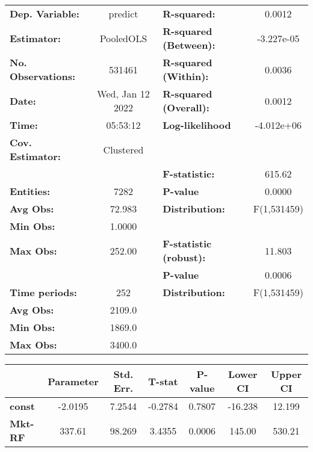\begin{center}
\begin{tabular}{lclc}
\toprule
\textbf{Dep. Variable:}    &      predict       & \textbf{  R-squared:         }   &      0.0012      \\
\textbf{Estimator:}        &     PooledOLS      & \textbf{  R-squared (Between):}  &    -3.227e-05    \\
\textbf{No. Observations:} &       531461       & \textbf{  R-squared (Within):}   &      0.0036      \\
\textbf{Date:}             &  Wed, Jan 12 2022  & \textbf{  R-squared (Overall):}  &      0.0012      \\
\textbf{Time:}             &      05:53:12      & \textbf{  Log-likelihood     }   &    -4.012e+06    \\
\textbf{Cov. Estimator:}   &     Clustered      & \textbf{                     }   &                  \\
\textbf{}                  &                    & \textbf{  F-statistic:       }   &      615.62      \\
\textbf{Entities:}         &        7282        & \textbf{  P-value            }   &      0.0000      \\
\textbf{Avg Obs:}          &       72.983       & \textbf{  Distribution:      }   &   F(1,531459)    \\
\textbf{Min Obs:}          &       1.0000       & \textbf{                     }   &                  \\
\textbf{Max Obs:}          &       252.00       & \textbf{  F-statistic (robust):} &      11.803      \\
\textbf{}                  &                    & \textbf{  P-value            }   &      0.0006      \\
\textbf{Time periods:}     &        252         & \textbf{  Distribution:      }   &   F(1,531459)    \\
\textbf{Avg Obs:}          &       2109.0       & \textbf{                     }   &                  \\
\textbf{Min Obs:}          &       1869.0       & \textbf{                     }   &                  \\
\textbf{Max Obs:}          &       3400.0       & \textbf{                     }   &                  \\
\bottomrule
\end{tabular}
\begin{tabular}{lcccccc}
                & \textbf{Parameter} & \textbf{Std. Err.} & \textbf{T-stat} & \textbf{P-value} & \textbf{Lower CI} & \textbf{Upper CI}  \\
\midrule
\textbf{const}  &      -2.0195       &       7.2544       &     -0.2784     &      0.7807      &      -16.238      &       12.199       \\
\textbf{Mkt-RF} &       337.61       &       98.269       &      3.4355     &      0.0006      &       145.00      &       530.21       \\
\bottomrule
\end{tabular}
\end{center}
